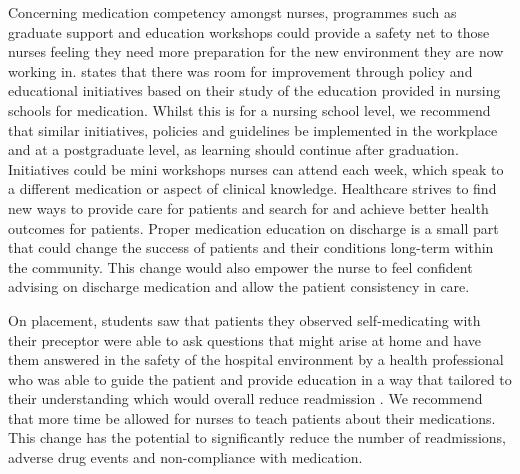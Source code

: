 \documentclass[british,12pt,a4paper]{article}
\begin{document}
Concerning medication competency amongst nurses, programmes such as graduate support and education workshops could provide a safety net to those nurses feeling they need more preparation for the new environment they are now working in. \citeauthor{Sulosaari2014} states that there was room for improvement through policy and educational initiatives based on their study of the education provided in nursing schools for medication. Whilst this is for a nursing school level, we recommend that similar initiatives, policies and guidelines be implemented in the workplace and at a postgraduate level, as learning should continue after graduation. Initiatives could be mini workshops nurses can attend each week, which speak to a different medication or aspect of clinical knowledge. Healthcare strives to find new ways to provide care for patients and search for and achieve better health outcomes for patients. Proper medication education on discharge is a small part that could change the success of patients and their conditions long-term within the community. This change would also empower the nurse to feel confident advising on discharge medication and allow the patient consistency in care.

On placement, students saw that patients they observed self-medicating with their preceptor were able to ask questions that might arise at home and have them answered in the safety of the hospital environment by a health professional who was able to guide the patient and provide education in a way that tailored to their understanding which would overall reduce readmission \parencite{Sanjai2019}. We recommend that more time be allowed for nurses to teach patients about their medications. This change has the potential to significantly reduce the number of readmissions, adverse drug events and non-compliance with medication.
\end{document}
